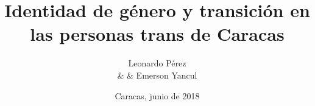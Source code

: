 \documentclass[12pt,letterpaper,twoside,openright,oldfontcommands]{memoir}
\author{Leonardo Pérez \\ & & Emerson Yancul}
\date{Caracas, junio de 2018}
\title{Identidad de género y transición en las personas trans de Caracas}
\begin{document}
    \maketitle
    \nocite{*}
    \frontmatter
    
    \tableofcontents
    \cleardoublepage
    \listoftables*
    \listoffigures*
    \mainmatter
    
    
    
    
    \printbibliography
    \appendix
    \appendixpage
\end{document}
